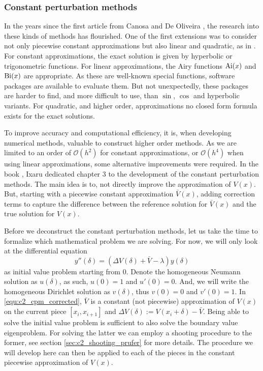 \subsubsection{Constant perturbation methods}

In the years since the first article from Canosa and De Oliveira \cite{canosa_new_1970}, the research into these kinds of methods has flourished. One of the first extensions was to consider not only piecewise constant approximations but also linear and quadratic, as in \cite{pruess_estimating_1973}. For constant approximations, the exact solution is given by hyperbolic or trigonometric functions. For linear approximations, the Airy functions $\operatorname{Ai}(x)$ and $\operatorname{Bi}(x)$ are appropriate. As these are well-known special functions, software packages are available to evaluate them. But not unexpectedly, these packages are harder to find, and more difficult to use, than $\sin$, $\cos$ and hyperbolic variants. For quadratic, and higher order, approximations no closed form formula exists for the exact solutions.

To improve accuracy and computational efficiency, it is, when developing numerical methods, valuable to construct higher order methods. As we are limited to an order of $\mathcal{O}(h^2)$ for constant approximations, or $\mathcal{O}(h^4)$ when using linear approximations, some alternative improvements were required. In the book \cite{ixaru_numerical_1984}, Ixaru dedicated chapter 3 to the development of the constant perturbation methods. The main idea is to, not directly improve the approximation of $V(x)$. But, starting with a piecewise constant approximation $\bar{V}(x)$, adding correction terms to capture the difference between the reference solution for $\bar{V}(x)$ and the true solution for $V(x)$.

Before we deconstruct the constant perturbation methods, let us take the time to formalize which mathematical problem we are solving. For now, we will only look at the differential equation
\begin{equation}\label{equ:c2_cpm_corrected}
    y''(\delta) = (\Delta V(\delta) + \bar{V} - \lambda) y(\delta)
\end{equation}
as initial value problem starting from $0$. Denote the homogeneous Neumann solution as $u(\delta)$, as such, $u(0) = 1$ and $u'(0) = 0$. And, we will write the homogeneous Dirichlet solution as $v(\delta)$, thus $v(0) = 0$ and $v'(0)=1$. In \eqref{equ:c2_cpm_corrected}, $\bar{V}$ is a constant (not piecewise) approximation of $V(x)$ on the current piece $[x_i, x_{i+1}]$ and $\Delta V(\delta) := V(x_i + \delta) - \bar{V}$. Being able to solve the initial value problem is sufficient to also solve the boundary value eigenproblem. For solving the latter we can employ a shooting procedure to the former, see section \ref{sec:c2_shooting_prufer} for more details. The procedure we will develop here can then be applied to each of the pieces in the constant piecewise approximation of $V(x)$.

